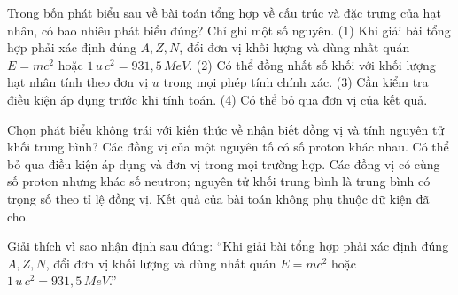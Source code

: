 \begin{ex}
Trong bốn phát biểu sau về bài toán tổng hợp về cấu trúc và đặc trưng của hạt nhân, có bao nhiêu phát biểu đúng? Chỉ ghi một số nguyên. (1) Khi giải bài tổng hợp phải xác định đúng $A,Z,N$, đổi đơn vị khối lượng và dùng nhất quán $E=mc^2$ hoặc $1\,u\,c^2=931,5\,MeV$. (2) Có thể đồng nhất số khối với khối lượng hạt nhân tính theo đơn vị $u$ trong mọi phép tính chính xác. (3) Cần kiểm tra điều kiện áp dụng trước khi tính toán. (4) Có thể bỏ qua đơn vị của kết quả.
\end{ex}

\begin{ex}
Chọn phát biểu không trái với kiến thức về nhận biết đồng vị và tính nguyên tử khối trung bình?
\choice
{Các đồng vị của một nguyên tố có số proton khác nhau.}
{Có thể bỏ qua điều kiện áp dụng và đơn vị trong mọi trường hợp.}
{\True Các đồng vị có cùng số proton nhưng khác số neutron; nguyên tử khối trung bình là trung bình có trọng số theo tỉ lệ đồng vị.}
{Kết quả của bài toán không phụ thuộc dữ kiện đã cho.}
\end{ex}

\begin{bt}
Giải thích vì sao nhận định sau đúng: “Khi giải bài tổng hợp phải xác định đúng $A,Z,N$, đổi đơn vị khối lượng và dùng nhất quán $E=mc^2$ hoặc $1\,u\,c^2=931,5\,MeV$.”
\end{bt}

